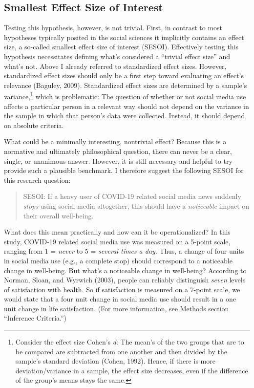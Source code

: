 \documentclass[
  man,mask]{apa6}
\begin{document}
\hypertarget{smallest-effect-size-of-interest}{%
\subsection{Smallest Effect Size of Interest}\label{smallest-effect-size-of-interest}}

Testing this hypothesis, however, is not trivial.
First, in contrast to most hypotheses typically posited in the social sciences it implicitly contains an effect size, a so-called smallest effect size of interest (SESOI).
Effectively testing this hypothesis necessitates defining what's considered a ``trivial effect size'' and what's not.
Above I already referred to standardized effect sizes.
However, standardized effect sizes should only be a first step toward evaluating an effect's relevance (Baguley, 2009).
Standardized effect sizes are determined by a sample's variance,\footnote{Consider the effect size Cohen's \emph{d}: The mean's of the two groups that are to be compared are subtracted from one another and then divided by the sample's standard deviation (Cohen, 1992). Hence, if there is more deviation/variance in a sample, the effect size decreases, even if the difference of the group's means stays the same.} which is problematic:
The question of whether or not social media use affects a particular person in a relevant way should not depend on the variance in the sample in which that person's data were collected.
Instead, it should depend on absolute criteria.

What could be a minimally interesting, nontrivial effect?
Because this is a normative and ultimately philosophical question, there can never be a clear, single, or unanimous answer.
However, it is still necessary and helpful to try provide such a plausible benchmark.
I therefore suggest the following SESOI for this research question:

\begin{quote}
SESOI: If a heavy user of COVID-19 related social media news suddenly \emph{stops} using social media altogether, this should have a \emph{noticeable} impact on their overall well-being.
\end{quote}

What does this mean practically and how can it be operationalized?
In this study, COVID-19 related social media use was measured on a 5-point scale, ranging from 1 = \emph{never} to 5 = \emph{several times a day}.
Thus, a change of four units in social media use (e.g., a complete stop) should correspond to a noticeable change in well-being.
But what's a noticeable change in well-being?
According to Norman, Sloan, and Wyrwich (2003), people can reliably distinguish \emph{seven} levels of satisfaction with health.
So if satisfaction is measured on a 7-point scale, we would state that a four unit change in social media use should result in a one unit change in life satisfaction.
(For more information, see Methods section ``Inference Criteria.'')
\end{document}
